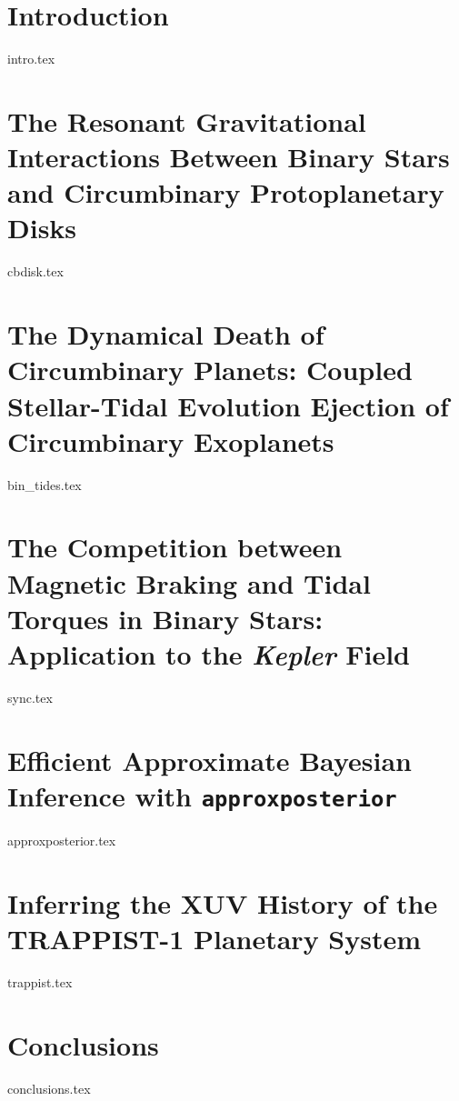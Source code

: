 \documentclass [11pt, proquest]{uwthesis} %
\newcommand{\approxposterior}[0]{\texttt{approxposterior}\xspace}
\newcommand{\kepler}[0]{\textit{Kepler}\xspace}
\begin{document}
%
%

\textpages
 

\chapter{Introduction}
{intro.tex}

\chapter{The Resonant Gravitational Interactions Between Binary Stars and Circumbinary Protoplanetary Disks}
{cbdisk.tex}

\chapter{The Dynamical Death of Circumbinary Planets: Coupled Stellar-Tidal Evolution Ejection of Circumbinary Exoplanets}
{bin_tides.tex}

\chapter{The Competition between Magnetic Braking and Tidal Torques in Binary Stars: Application to the \kepler Field}
{sync.tex}

\chapter{Efficient Approximate Bayesian Inference with \approxposterior}
{approxposterior.tex}

\chapter{Inferring the XUV History of the TRAPPIST-1 Planetary System}
{trappist.tex}

\chapter{Conclusions}
{conclusions.tex}

\printendnotes

%
%

%
%

\appendix
\raggedbottom\sloppy
\end{document}
